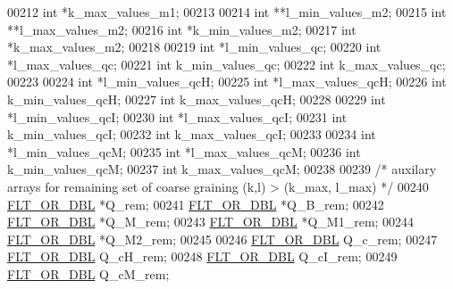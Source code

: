 \begin{DoxyCode}
00212   \textcolor{keywordtype}{int}             *k\_max\_values\_m1;
00213 
00214   \textcolor{keywordtype}{int}             **l\_min\_values\_m2;
00215   \textcolor{keywordtype}{int}             **l\_max\_values\_m2;
00216   \textcolor{keywordtype}{int}             *k\_min\_values\_m2;
00217   \textcolor{keywordtype}{int}             *k\_max\_values\_m2;
00218 
00219   \textcolor{keywordtype}{int}             *l\_min\_values\_qc;
00220   \textcolor{keywordtype}{int}             *l\_max\_values\_qc;
00221   \textcolor{keywordtype}{int}             k\_min\_values\_qc;
00222   \textcolor{keywordtype}{int}             k\_max\_values\_qc;
00223 
00224   \textcolor{keywordtype}{int}             *l\_min\_values\_qcH;
00225   \textcolor{keywordtype}{int}             *l\_max\_values\_qcH;
00226   \textcolor{keywordtype}{int}             k\_min\_values\_qcH;
00227   \textcolor{keywordtype}{int}             k\_max\_values\_qcH;
00228 
00229   \textcolor{keywordtype}{int}             *l\_min\_values\_qcI;
00230   \textcolor{keywordtype}{int}             *l\_max\_values\_qcI;
00231   \textcolor{keywordtype}{int}             k\_min\_values\_qcI;
00232   \textcolor{keywordtype}{int}             k\_max\_values\_qcI;
00233 
00234   \textcolor{keywordtype}{int}             *l\_min\_values\_qcM;
00235   \textcolor{keywordtype}{int}             *l\_max\_values\_qcM;
00236   \textcolor{keywordtype}{int}             k\_min\_values\_qcM;
00237   \textcolor{keywordtype}{int}             k\_max\_values\_qcM;
00238 
00239   \textcolor{comment}{/* auxilary arrays for remaining set of coarse graining (k,l) > (k\_max, l\_max) */}
00240   \hyperlink{group__data__structures_ga31125aeace516926bf7f251f759b6126}{FLT\_OR\_DBL}      *Q\_rem;
00241   \hyperlink{group__data__structures_ga31125aeace516926bf7f251f759b6126}{FLT\_OR\_DBL}      *Q\_B\_rem;
00242   \hyperlink{group__data__structures_ga31125aeace516926bf7f251f759b6126}{FLT\_OR\_DBL}      *Q\_M\_rem;
00243   \hyperlink{group__data__structures_ga31125aeace516926bf7f251f759b6126}{FLT\_OR\_DBL}      *Q\_M1\_rem;
00244   \hyperlink{group__data__structures_ga31125aeace516926bf7f251f759b6126}{FLT\_OR\_DBL}      *Q\_M2\_rem;
00245 
00246   \hyperlink{group__data__structures_ga31125aeace516926bf7f251f759b6126}{FLT\_OR\_DBL}      Q\_c\_rem;
00247   \hyperlink{group__data__structures_ga31125aeace516926bf7f251f759b6126}{FLT\_OR\_DBL}      Q\_cH\_rem;
00248   \hyperlink{group__data__structures_ga31125aeace516926bf7f251f759b6126}{FLT\_OR\_DBL}      Q\_cI\_rem;
00249   \hyperlink{group__data__structures_ga31125aeace516926bf7f251f759b6126}{FLT\_OR\_DBL}      Q\_cM\_rem;

\end{DoxyCode}
